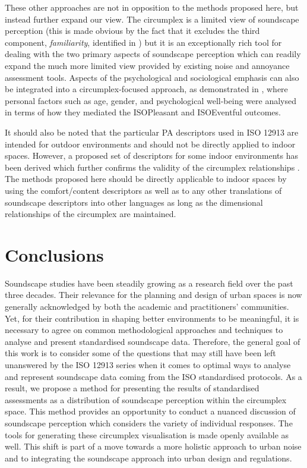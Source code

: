 These other approaches are not in opposition to the methods proposed here, but instead further expand our view. The circumplex is a limited view of soundscape perception (this is made obvious by the fact that it excludes the third component, \emph{familiarity}, identified in \citet{Axelsson2010principal}) but it is an exceptionally rich tool for dealing with the two primary aspects of soundscape perception which can readily expand the much more limited view provided by existing noise and annoyance assessment tools. Aspects of the psychological and sociological emphasis can also be integrated into a circumplex-focused approach, as demonstrated in \citet{Erfanian2021Psychological}, where personal factors such as age, gender, and psychological well-being were analysed in terms of how they mediated the ISOPleasant and ISOEventful outcomes.

It should also be noted that the particular PA descriptors used in ISO 12913 are intended for outdoor environments and should not be directly applied to indoor spaces. However, a proposed set of descriptors for some indoor environments has been derived which further confirms the validity of the circumplex relationships \citep{Torresin2020Indoor}. The methods proposed here should be directly applicable to indoor spaces by using the comfort/content descriptors as well as to any other translations of soundscape descriptors into other languages \citep{Aletta2020Soundscape} as long as the dimensional relationships of the circumplex are maintained.


\section{Conclusions}
Soundscape studies have been steadily growing as a research field over the past three decades. Their relevance for the planning and design of urban spaces is now generally acknowledged by both the academic and practitioners' communities. Yet, for their contribution in shaping better environments to be meaningful, it is necessary to agree on common methodological approaches and techniques to analyse and present standardised soundscape data. Therefore, the general goal of this work is to consider some of the questions that may still have been left unanswered by the ISO 12913 series when it comes to optimal ways to analyse and represent soundscape data coming from the ISO standardised protocols. As a result, we propose a method for presenting the results of standardised
assessments as a distribution of soundscape perception within the circumplex space. This method provides an opportunity to conduct a nuanced discussion of soundscape perception which considers the variety of individual responses. The tools for generating these circumplex visualisation is made openly available as well. This shift is part of a move towards a more holistic approach to urban noise and to integrating the soundscape approach into urban design and regulations.

